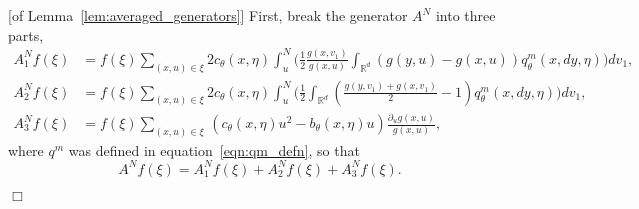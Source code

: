\documentclass[12pt]{article}
\newenvironment {proof}{{\noindent\bf Proof }}{\hfill $\Box$ \medskip}
\newcommand{\IR}{\mathbb R}
\newcommand{\lp}{\xi}              %
\numberwithin{equation}{section}
\begin{document}
\begin{proof}[of Lemma~\ref{lem:averaged_generators}]
First, break the generator $A^N$ into three parts, 
\begin{align*}
    A^N_1f(\lp)
    &=
    f(\lp) \sum_{(x,u)\in\lp} 2 c_\theta(x,\eta)
    \int_u^{N}\Bigg(
        \frac{1}{2}\frac{g(x,v_1)}{g(x,u)}
        \int_{\IR^d} (g(y,u)-g(x,u))q^m_{\theta}(x,dy,\eta)
    \Bigg)dv_1 ,
    \\
    A^N_2f(\lp)
    &=
    f(\lp) \sum_{(x,u)\in\lp} 2 c_\theta(x,\eta)
    \int_u^{N}\Bigg(
        \frac{1}{2}\int_{\IR^d}
            \left(\frac{g(y,v_1) + g(x,v_1)}{2} - 1\right)
        q^m_{\theta}(x,dy,\eta)
    \Bigg)dv_1 ,
    \\
    A^N_3f(\lp)
    &=
    f(\lp) \sum_{(x,u)\in\lp}\,
    \left( c_\theta(x,\eta) u^2 - b_{\theta}(x,\eta)u \right) \frac{\partial_u g(x,u)}{g(x,u)},
\end{align*}
where $q^m$ was defined in equation~\eqref{eqn:qm_defn},
so that 
$$ A^Nf(\lp) = A^N_1f(\lp) + A^N_2f(\lp) + A^N_3f(\lp). $$


\end{proof}
\end{document}
